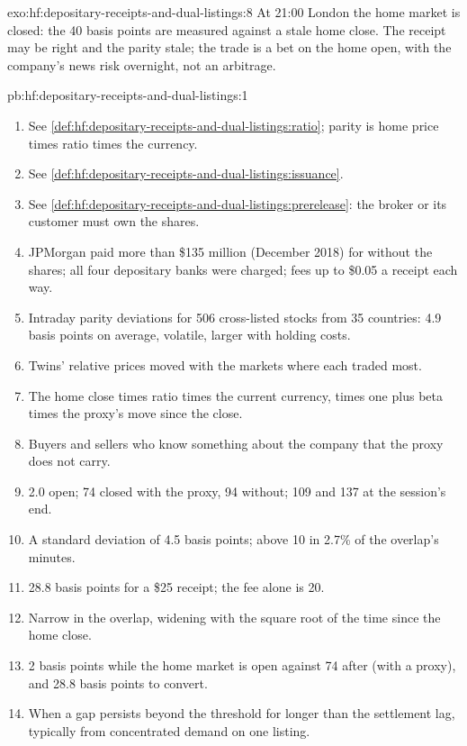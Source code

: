 \begin{solution}{exo:hf:depositary-receipts-and-dual-listings:8}
At 21:00 London the home market is closed: the 40 basis points are measured against a stale home close. The receipt may be right and the parity
stale; the trade is a bet on the home open, with the company's news risk overnight, not an arbitrage.
\end{solution}

\begin{solution}{pb:hf:depositary-receipts-and-dual-listings:1}
\begin{enumerate}
\item See \cref{def:hf:depositary-receipts-and-dual-listings:ratio}; parity is home price times ratio times the currency.
\item See \cref{def:hf:depositary-receipts-and-dual-listings:issuance}.
\item See \cref{def:hf:depositary-receipts-and-dual-listings:prerelease}: the broker or its customer must own the shares.
\item JPMorgan paid more than \$135 million (December 2018) for  without the shares; all four depositary banks were charged; fees up to
\$0.05 a receipt each way.
\item Intraday parity deviations for 506 cross-listed stocks from 35 countries: 4.9 basis points on average, volatile, larger with holding costs.
\item Twins' relative prices moved with the markets where each traded most.
\item The home close times ratio times the current currency, times one plus beta times the proxy's move since the close.
\item Buyers and sellers who know something about the company that the proxy does not carry.
\item 2.0 open; 74 closed with the proxy, 94 without; 109 and 137 at the session's end.
\item A standard deviation of 4.5 basis points; above 10 in 2.7\% of the overlap's minutes.
\item 28.8 basis points for a \$25 receipt; the fee alone is 20.
\item Narrow in the overlap, widening with the square root of the time since the home close.
\item 2 basis points while the home market is open against 74 after (with a proxy), and 28.8 basis points to convert.
\item When a gap persists beyond the threshold for longer than the settlement lag, typically from concentrated demand on one listing.

\end{enumerate}
\end{solution}
